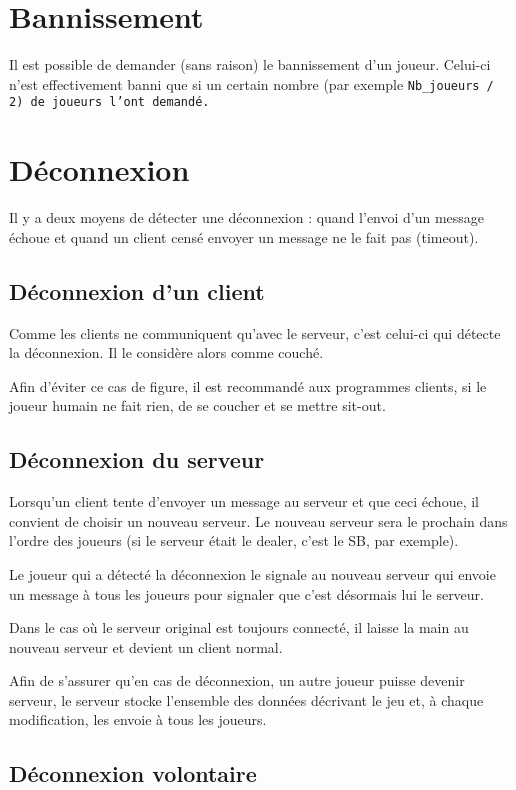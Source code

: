 \section{Bannissement}

Il est possible de demander (sans raison) le bannissement d'un joueur.
Celui-ci n'est effectivement banni que si un certain nombre (par exemple \tt Nb\_joueurs / 2\rm) de joueurs l'ont demandé.

\section{Déconnexion}

Il y a deux moyens de détecter une déconnexion : quand l'envoi d'un message échoue et quand un client censé envoyer un message ne le fait pas (timeout).

\subsection{Déconnexion d'un client}

Comme les clients ne communiquent qu'avec le serveur, c'est celui-ci qui détecte la déconnexion.
Il le considère alors comme couché.

Afin d'éviter ce cas de figure, il est recommandé aux programmes clients, si le joueur humain ne fait rien, de se coucher et se mettre sit-out.

\subsection{Déconnexion du serveur}

Lorsqu'un client tente d'envoyer un message au serveur et que ceci échoue, il convient de choisir un nouveau serveur.
Le nouveau serveur sera le prochain dans l'ordre des joueurs (si le serveur était le dealer, c'est le SB, par exemple).

Le joueur qui a détecté la déconnexion le signale au nouveau serveur qui envoie un message à tous les joueurs pour signaler que c'est désormais lui le serveur.

Dans le cas où le serveur original est toujours connecté, il laisse la main au nouveau serveur et devient un client normal.

Afin de s'assurer qu'en cas de déconnexion, un autre joueur puisse devenir serveur, le serveur stocke l'ensemble des données décrivant le jeu et, à chaque modification, les envoie à tous les joueurs.

\subsection{Déconnexion volontaire}


